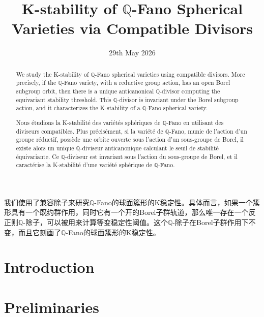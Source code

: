 \documentclass[11pt, oneside]{amsart}
\title{K-stability of $\mathbb{Q}$-Fano Spherical Varieties via Compatible Divisors}
\date{29th May 2026}
\newcommand{\nocontentsline}[3]{}
\let\origcontentsline\addcontentsline
\newcommand\stoptoc{\let\addcontentsline\nocontentsline}
\newcommand\resumetoc{\let\addcontentsline\origcontentsline}
\begin{document}
\maketitle

\begin{abstract}
  We study the K-stability of $\mathbb{Q}$-Fano spherical varieties using compatible divisors. More precisely, if the $\mathbb{Q}$-Fano variety, with a reductive group action, has an open Borel subgroup orbit, then there is a unique anticanonical $\mathbb{Q}$-divisor computing the equivariant stability threshold. This $\mathbb{Q}$-divisor is invariant under the Borel subgroup action, and it characterizes the K-stability of a $\mathbb{Q}$-Fano spherical variety.
\end{abstract}
\begin{abstractZH}
  我们使用了兼容除子来研究$\mathbb{Q}$-Fano的球面簇形的K稳定性。具体而言，如果一个簇形具有一个既约群作用，同时它有一个开的Borel子群轨道，那么唯一存在一个反正则$\mathbb{Q}$-除子，可以被用来计算等变稳定性阈值。这个$\mathbb{Q}$-除子在Borel子群作用下不变，而且它刻画了$\mathbb{Q}$-Fano的球面簇形的K稳定性。
\end{abstractZH}
\begin{otherlanguage}{french}
\begin{abstract}
  Nous étudions la K-stabilité des variétés sphériques de $\mathbb{Q}$-Fano en utilisant des diviseurs compatibles. Plus précisément, si la variété de $\mathbb{Q}$-Fano, munie de l'action d'un groupe réductif, possède une orbite ouverte sous l'action d'un sous-groupe de Borel, il existe alors un unique $\mathbb{Q}$-diviseur anticanonique calculant le seuil de stabilité équivariante. Ce $\mathbb{Q}$-diviseur est invariant sous l'action du sous-groupe de Borel, et il caractérise la K-stabilité d'une variété sphérique de $\mathbb{Q}$-Fano.
\end{abstract}
\end{otherlanguage}

\tableofcontents

\section*{Introduction}\label{sec:intro}
\begingroup
  \renewcommand{\thetheorem}{(\Alph{theorem})}
  \stoptoc
  
  \resumetoc
\endgroup

\section{Preliminaries}\label{sec:prelim}

\end{document}
